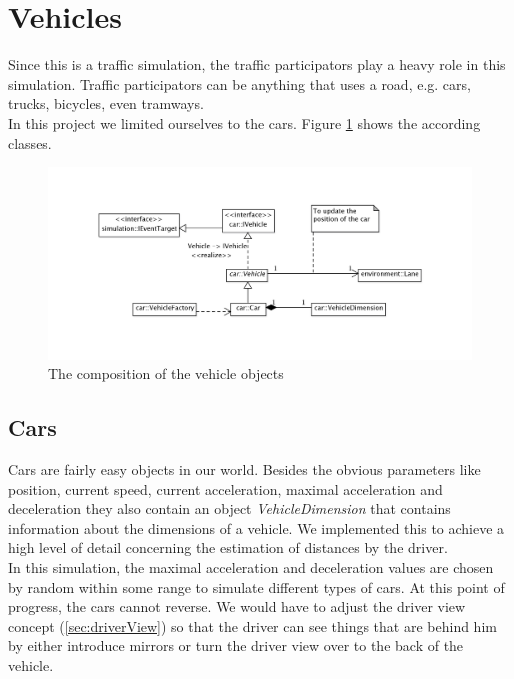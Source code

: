 
\section{Vehicles}
\label{sec:vehicles}

Since this is a traffic simulation, the traffic participators play a
heavy role in this simulation. Traffic participators can be anything
that uses a road, e.g.  cars, trucks, bicycles, even tramways. \\

\noindent In this project we limited ourselves to the cars. Figure 
\ref{fig:vehicles} shows the according classes. \\

\begin{figure}[H]
\begin{center}
\includegraphics[width=\textwidth]{images/vehicles.png}
\end{center}
\caption{The composition of the vehicle objects}
\label{fig:vehicles}
\end{figure}

\subsection{Cars}

Cars are fairly easy objects in our world. Besides the obvious parameters
like position, current speed, current acceleration, maximal acceleration
and deceleration they also contain an object \emph{VehicleDimension} that
contains information about the dimensions of a vehicle. We implemented this
to achieve a high level of detail concerning the estimation of distances
by the driver. \\

In this simulation, the maximal acceleration and deceleration values
are chosen by random within some range to simulate different types of
cars. At this point of progress, the cars cannot reverse. We would have
to adjust the driver view concept (\ref{sec:driverView}) so that the
driver can see things that are behind him by either introduce mirrors
or turn the driver view over to the back of the vehicle.

